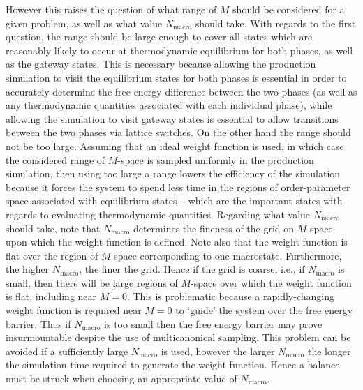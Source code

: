 \documentclass{report}
\begin{document}
However this raises the question of what range of $M$ should be considered for a given problem, as well as what value $N_{\text{macro}}$ should take.
With regards to the first question, the range should be large enough to cover all states which are reasonably likely to occur at thermodynamic
equilibrium for both phases, as well as the gateway states. This is necessary because allowing the production simulation to visit the equilibrium states for 
both phases is essential in order to accurately determine the free energy difference between the two phases (as well as any thermodynamic quantities 
associated with each individual phase), while allowing the simulation to visit gateway states is essential to allow transitions between the two phases
via lattice switches. On the other hand the range should not be too large. Assuming that an ideal weight function is used, in which case the considered
range of $M$-space is sampled uniformly in the production simulation, then using too large a range lowers the efficiency of the simulation because 
it forces the system to spend less time in the regions of order-parameter space associated with equilibrium states -- which are the important states with
regards to evaluating thermodynamic quantities.
%
Regarding what value $N_{\text{macro}}$ should take, note that $N_{\text{macro}}$ determines the fineness of the grid on $M$-space upon which
the weight function is defined. Note also that the weight function is flat over the region of $M$-space corresponding to one macrostate. Furthermore, the 
higher $N_{\text{macro}}$, the finer the grid. Hence if the grid is coarse, i.e., if $N_{\text{macro}}$ is small, then there will be large regions of $M$-space
over which the weight function is flat, including near $M=0$. This is problematic because a rapidly-changing weight function is required near $M=0$ to 
`guide' the system over the free energy barrier. Thus if $N_{\text{macro}}$ is too small then the free energy barrier may prove insurmountable despite the
use of multicanonical sampling. This problem can be avoided if a sufficiently large $N_{\text{macro}}$ is used, however the larger $N_{\text{macro}}$ the
longer the simulation time required to generate the weight function. Hence a balance must be struck when choosing an appropriate value of $N_{\text{macro}}$.
\end{document}

